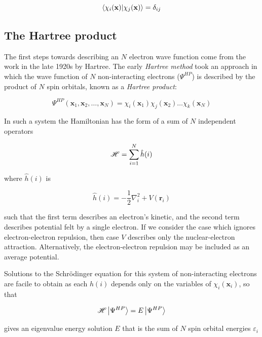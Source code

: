 \begin{equation}
\bra{\chi_i(\mathbf{x})}\ket{\chi_j(\mathbf{x})} = \delta_{ij}
\end{equation}

\subsection{The Hartree product}

The first steps towards describing an $N$ electron wave function come from the
work in the late 1920s by Hartree. The early \emph{Hartree method} took an
approach in which the wave function of $N$ non-interacting electrons
($\Psi^{HP}$) is described by the product of $N$ spin orbitals, known as a
\emph{Hartree product}:

\begin{equation}
\Psi^{HP}(\mathbf{x}_1,\mathbf{x}_2,\ldots,\mathbf{x}_N) = \chi_i(\mathbf{x}_1)\chi_j(\mathbf{x}_2)\dots\chi_k(\mathbf{x}_N)
\end{equation}

\noindent In such a system the Hamiltonian has the form of a sum of $N$
independent operators

\begin{equation}
  \mathscr{H} = \sum_{i=1}^N \hat{h}(i)
\end{equation}

\noindent where $\hat{h}(i)$ is

\begin{equation}
  \hat{h}(i) = -\frac{1}{2} \nabla_i^2 + V(\mathbf{r}_i)
\end{equation}

\noindent such that the first term describes an electron's kinetic, and the
second term describes potential felt by a single electron. If we consider the
case which ignores electron-electron repulsion, then case $V$ describes only
the nuclear-electron attraction. Alternatively, the electron-electron repulsion
may be included as an average potential.

Solutions to the Schr{\"o}dinger equation for this system of non-interacting
electrons are facile to obtain as each $h(i)$ depends only on the variables of
$\chi_i(\mathbf{x}_i)$, so that

\begin{equation}
  \mathscr{H} \ket{\Psi^{HP}} = E \ket{\Psi^{HP}}
\end{equation}

\noindent gives an eigenvalue energy solution $E$ that is the sum of $N$ spin
orbital energies $\varepsilon_i$

